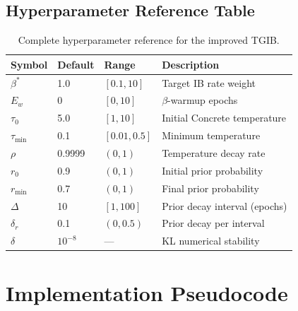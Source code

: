 \documentclass[11pt,a4paper]{article}
\begin{document}
\subsection{Hyperparameter Reference Table}

\begin{table}[ht]
\centering
\caption{Complete hyperparameter reference for the improved TGIB.}
\label{tab:hyperparams}
\begin{tabular}{@{}llll@{}}
\toprule
Symbol & Default & Range & Description \\
\midrule
$\beta^*$    & 1.0   & $[0.1, 10]$  & Target IB rate weight \\
$E_w$        & 0     & $[0, 10]$    & $\beta$-warmup epochs \\
$\tau_0$     & 5.0   & $[1, 10]$    & Initial Concrete temperature \\
$\tau_{\min}$& 0.1   & $[0.01, 0.5]$& Minimum temperature \\
$\rho$       & 0.9999& $(0, 1)$      & Temperature decay rate \\
$r_0$        & 0.9   & $(0, 1)$      & Initial prior probability \\
$r_{\min}$   & 0.7   & $(0, 1)$      & Final prior probability \\
$\Delta$     & 10    & $[1, 100]$   & Prior decay interval (epochs) \\
$\delta_r$   & 0.1   & $(0, 0.5)$   & Prior decay per interval \\
$\delta$     & $10^{-8}$ & ---       & KL numerical stability \\
\bottomrule
\end{tabular}
\end{table}

\section{Implementation Pseudocode}
\label{sec:pseudocode}
\end{document}
